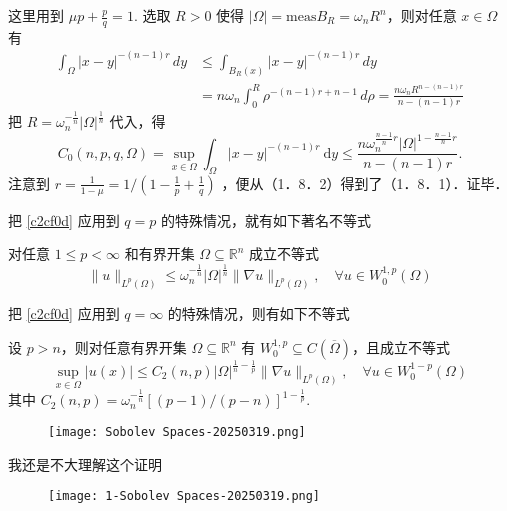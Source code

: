 这里用到 $\mu p+\frac{p}{q}=1$. 选取 $R>0$ 使得 $\lvert \Omega \rvert=\mathrm{meas}B_{R}=\omega _nR^{n}$，则对任意 $x\in \Omega$ 有
\[
\begin{aligned}
\int_{\Omega}^{} \lvert x-y \rvert ^{-(n-1)r} \, dy  & \leq \int_{B_{R}(x)}^{} \lvert x-y \rvert ^{-(n-1)r} \, dy \\
  & =n\omega _n\int_{0}^{R} \rho^{-(n-1)r+n-1} \, d\rho= \frac{n\omega _nR^{n-(n-1)r}}{n-(n-1)r} 
\end{aligned}
\]
把 $R=\omega_n^{-\frac{1}{n}}|\Omega|^{\frac{1}{n}}$ 代入，得
\[
C_0(n, p, q, \Omega)=\sup _{x \in \Omega} \int_{\Omega}|x-y|^{-(n-1) r} \mathrm{~d} y \leqslant \frac{n \omega_n^{\frac{n-1}{n} r}|\Omega|^{1-\frac{n-1}{n} r}}{n-(n-1) r} .
\]
注意到 $r=\frac{1}{1-\mu}=1 /\left(1-\frac{1}{p}+\frac{1}{q}\right)$ ，便从（1．8．2）得到了（1．8．1）．证毕．

把 \cref{c2cf0d} 应用到 $q=p$ 的特殊情况，就有如下著名不等式

\begin{theorem}
对任意 $1\leq p<\infty$ 和有界开集 $\Omega \subseteq \mathbb{R}^{n}$ 成立不等式
\[
\lVert u \rVert _{L^{p}(\Omega)}\leq \omega _n^{-\frac{1}{n}}\lvert \Omega \rvert ^{\frac{1}{n}}\lVert \nabla u \rVert _{L^{p}(\Omega)},\quad \forall u\in W_0^{1,p}(\Omega)
\]
\end{theorem}
把 \cref{c2cf0d} 应用到 $q=\infty$ 的特殊情况，则有如下不等式

\begin{corollary}
设 $p>n$，则对任意有界开集 $\Omega \subseteq \mathbb{R}^{n}$ 有 $W_0^{1,p}\subseteq C(\overline{\Omega})$，且成立不等式
\[
\sup_{x\in \Omega}\lvert u(x) \rvert \leq C_2(n,p)\lvert \Omega \rvert ^{\frac{1}{n}-\frac{1}{p}}\lVert \nabla u \rVert _{L^{p}(\Omega)},\quad \forall u\in W_{0}^{1-p}(\Omega)
\]
其中 $C_2(n,p)=\omega _n^{-\frac{1}{n}}[(p-1)/(p-n)]^{1-\frac{1}{p}}$.
\end{corollary}
\begin{theorem}
\begin{figure}[H]
\centering
\texttt{[image: Sobolev Spaces-20250319.png]}
\label{}
\end{figure}\label{63f437}
\end{theorem}

\begin{remark}
我还是不大理解这个证明
\end{remark}
\begin{figure}[H]
\centering
\texttt{[image: 1-Sobolev Spaces-20250319.png]}
\label{}
\end{figure}

